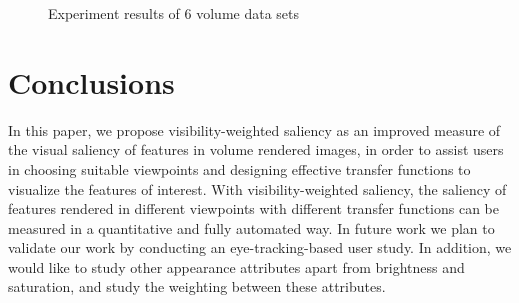 \begin{figure}
\begin{minipage}{.24\textwidth}
		\subcaption{}
	\end{minipage}
	\caption{Experiment results of 6 volume data sets \cite{website:Roettger_volume_2013} \cite{website:Voreen_datasets_2013}}
	\label{fig:mos_vs_metric}
\end{figure}

\section{Conclusions}
In this paper, we propose visibility-weighted saliency as an improved measure of the visual saliency of features in volume rendered images, in order to assist users in choosing suitable viewpoints and designing effective transfer functions to visualize the features of interest.
With visibility-weighted saliency, the saliency of features rendered in different viewpoints with different transfer functions can be measured in a quantitative and fully automated way.
In future work we plan to validate our work by conducting an eye-tracking-based user study. In addition, we would like to study other appearance attributes apart from brightness and saturation, and study the weighting between these attributes.
